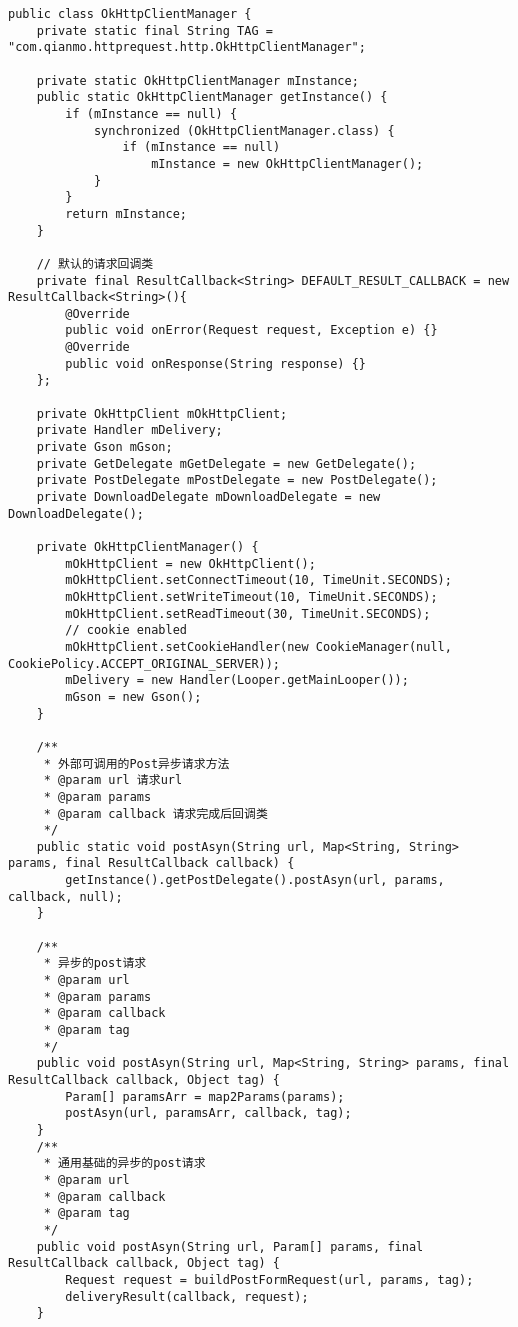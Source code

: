 \documentclass[9pt, b5paper]{article}
\begin{document}
\begin{verbatim}
public class OkHttpClientManager {
    private static final String TAG = "com.qianmo.httprequest.http.OkHttpClientManager";
 
    private static OkHttpClientManager mInstance;
    public static OkHttpClientManager getInstance() {
        if (mInstance == null) {
            synchronized (OkHttpClientManager.class) {
                if (mInstance == null) 
                    mInstance = new OkHttpClientManager();
            }
        }
        return mInstance;
    }

    // 默认的请求回调类
    private final ResultCallback<String> DEFAULT_RESULT_CALLBACK = new ResultCallback<String>(){
        @Override
        public void onError(Request request, Exception e) {}
        @Override
        public void onResponse(String response) {}
    };

    private OkHttpClient mOkHttpClient;
    private Handler mDelivery;
    private Gson mGson;
    private GetDelegate mGetDelegate = new GetDelegate();
    private PostDelegate mPostDelegate = new PostDelegate();
    private DownloadDelegate mDownloadDelegate = new DownloadDelegate();
 
    private OkHttpClientManager() {
        mOkHttpClient = new OkHttpClient();
        mOkHttpClient.setConnectTimeout(10, TimeUnit.SECONDS);
        mOkHttpClient.setWriteTimeout(10, TimeUnit.SECONDS);
        mOkHttpClient.setReadTimeout(30, TimeUnit.SECONDS);
        // cookie enabled
        mOkHttpClient.setCookieHandler(new CookieManager(null, CookiePolicy.ACCEPT_ORIGINAL_SERVER));
        mDelivery = new Handler(Looper.getMainLooper());
        mGson = new Gson();
    }
 
    /**
     * 外部可调用的Post异步请求方法
     * @param url 请求url
     * @param params
     * @param callback 请求完成后回调类
     */
    public static void postAsyn(String url, Map<String, String> params, final ResultCallback callback) {
        getInstance().getPostDelegate().postAsyn(url, params, callback, null);
    }
 
    /**
     * 异步的post请求
     * @param url
     * @param params
     * @param callback
     * @param tag
     */
    public void postAsyn(String url, Map<String, String> params, final ResultCallback callback, Object tag) {
        Param[] paramsArr = map2Params(params);
        postAsyn(url, paramsArr, callback, tag);
    }
    /**
     * 通用基础的异步的post请求
     * @param url
     * @param callback
     * @param tag
     */
    public void postAsyn(String url, Param[] params, final ResultCallback callback, Object tag) {
        Request request = buildPostFormRequest(url, params, tag);
        deliveryResult(callback, request);
    }
     

\end{verbatim}
\end{document}

